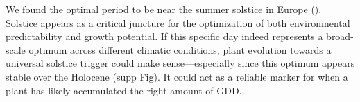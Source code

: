 \documentclass[11pt,letter]{article}
\begin{document}
We found the optimal period to be near the summer solstice in Europe (). Solstice appears as a critical juncture for the optimization of both environmental predictability and growth potential.
If this specific day indeed represents a broad-scale optimum across different climatic conditions, plant evolution towards a universal solstice trigger could make sense---especially since this optimum appears stable over the Holocene (supp Fig). %
It could act as a reliable marker for when a plant has likely accumulated the right amount of GDD. %
\end{document}
